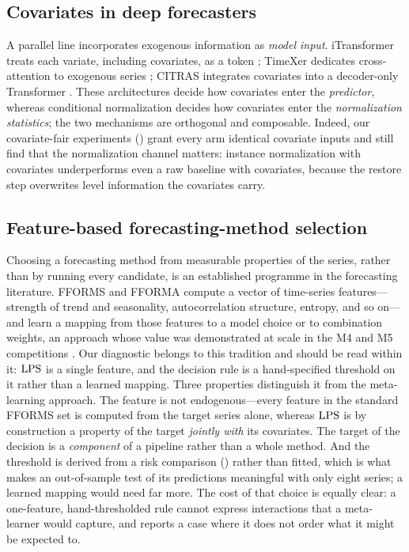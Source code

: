\subsection{Covariates in deep forecasters}

A parallel line incorporates exogenous information as \emph{model input}. iTransformer treats each variate, including covariates, as a token \citep{liu2024itransformer}; TimeXer dedicates cross-attention to exogenous series \citep{wang2024timexer}; CITRAS integrates covariates into a decoder-only Transformer \citep{citras2025}. These architectures decide how covariates enter the \emph{predictor}, whereas conditional normalization decides how covariates enter the \emph{normalization statistics}; the two mechanisms are orthogonal and composable. Indeed, our covariate-fair experiments () grant every arm identical covariate inputs and still find that the normalization channel matters: instance normalization with covariates underperforms even a raw baseline with covariates, because the restore step overwrites level information the covariates carry.

\subsection{Feature-based forecasting-method selection}

Choosing a forecasting method from measurable properties of the series, rather than by running every candidate, is an established programme in the forecasting literature. FFORMS and FFORMA \citep{talagala2023metalearning, monteromanso2020fforma} compute a vector of time-series features---strength of trend and seasonality, autocorrelation structure, entropy, and so on---and learn a mapping from those features to a model choice or to combination weights, an approach whose value was demonstrated at scale in the M4 and M5 competitions \citep{makridakis2020m4, makridakis2022m5}. Our diagnostic belongs to this tradition and should be read within it: $\mathrm{LPS}$ is a single feature, and the decision rule is a hand-specified threshold on it rather than a learned mapping. Three properties distinguish it from the meta-learning approach. The feature is not endogenous---every feature in the standard FFORMS set is computed from the target series alone, whereas $\mathrm{LPS}$ is by construction a property of the target \emph{jointly with} its covariates. The target of the decision is a \emph{component} of a pipeline rather than a whole method. And the threshold is derived from a risk comparison () rather than fitted, which is what makes an out-of-sample test of its predictions meaningful with only eight series; a learned mapping would need far more. The cost of that choice is equally clear: a one-feature, hand-thresholded rule cannot express interactions that a meta-learner would capture, and  reports a case where it does not order what it might be expected to.

